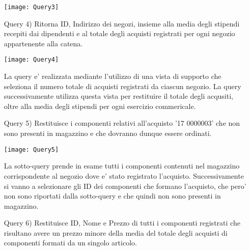 \begin{enumerate}


\begin{center}
\texttt{[image: Query3]}
\end{center}

\item[Query 4)] Ritorna ID, Indirizzo dei negozi, insieme alla media degli stipendi recepiti dai dipendenti e al totale degli acquisti registrati per ogni negozio appartenente alla catena.\\



\begin{center}
\texttt{[image: Query4]}
\end{center}

La query e' realizzata mediante l'utilizzo di una vista di supporto che seleziona il numero totale di acquisti registrati da ciascun negozio.  La query successivamente utilizza questa vista per restituire il totale degli acqusiti, oltre alla media degli stipendi per ogni esercizio commericale.\\

\item[Query 5)] Restituisce i componenti relativi all'acquisto '17 0000003' che non sono presenti in magazzino e che dovranno dunque essere ordinati.\\



\begin{center}
\texttt{[image: Query5]}
\end{center}

La sotto-query prende in esame tutti i componenti contenuti nel magazzino corrispondente al negozio dove e' stato registrato l'acquisto. Successivamente si vanno a selezionare gli ID dei componenti che formano l'acquisto, che pero' non sono riportati dalla sotto-query e che quindi non sono presenti in magazzino.\\

\item[Query 6)] Restituisce ID, Nome e Prezzo di tutti i componenti registrati che risultano avere un prezzo minore della media del totale degli acquisti di componenti formati da un singolo articolo. \\




\end{enumerate}
